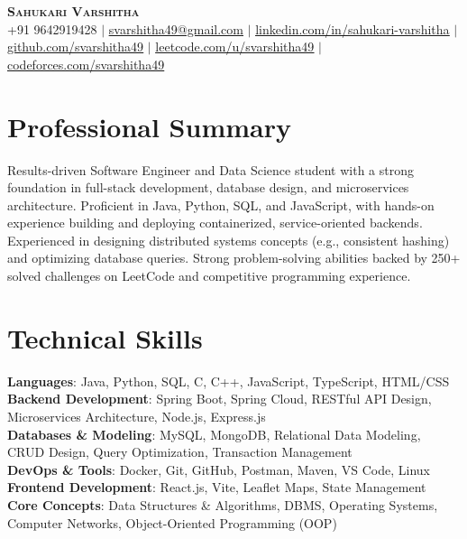 \documentclass[letterpaper,11pt]{article}
\begin{document}
\begin{center}
    \textbf{\Huge \scshape Sahukari Varshitha} \\ \vspace{1pt}
    \small +91 9642919428 $|$ \href{mailto:svarshitha49@gmail.com}{\underline{svarshitha49@gmail.com}} $|$ 
    \href{https://linkedin.com/in/sahukari-varshitha}{\underline{linkedin.com/in/sahukari-varshitha}} $|$ \\
    \href{https://github.com/svarshitha49}{\underline{github.com/svarshitha49}} $|$
    \href{https://leetcode.com/u/svarshitha49}{\underline{leetcode.com/u/svarshitha49}} $|$
    \href{https://codeforces.com/profile/svarshitha49}{\underline{codeforces.com/svarshitha49}}
\end{center}


\section{Professional Summary}
Results-driven Software Engineer and Data Science student with a strong foundation in full-stack development, database design, and microservices architecture. Proficient in Java, Python, SQL, and JavaScript, with hands-on experience building and deploying containerized, service-oriented backends. Experienced in designing distributed systems concepts (e.g., consistent hashing) and optimizing database queries. Strong problem-solving abilities backed by 250+ solved challenges on LeetCode and competitive programming experience.


\section{Technical Skills}
 \begin{itemize}[leftmargin=0.15in, label={}]
    \small{\item{
     \textbf{Languages}{: Java, Python, SQL, C, C++, JavaScript, TypeScript, HTML/CSS} \\
     \textbf{Backend Development}{: Spring Boot, Spring Cloud, RESTful API Design, Microservices Architecture, Node.js, Express.js} \\
     \textbf{Databases \& Modeling}{: MySQL, MongoDB, Relational Data Modeling, CRUD Design, Query Optimization, Transaction Management} \\
     \textbf{DevOps \& Tools}{: Docker, Git, GitHub, Postman, Maven, VS Code, Linux} \\
     \textbf{Frontend Development}{: React.js, Vite, Leaflet Maps, State Management} \\
     \textbf{Core Concepts}{: Data Structures \& Algorithms, DBMS, Operating Systems, Computer Networks, Object-Oriented Programming (OOP)}
    }}
 \end{itemize}
\end{document}
